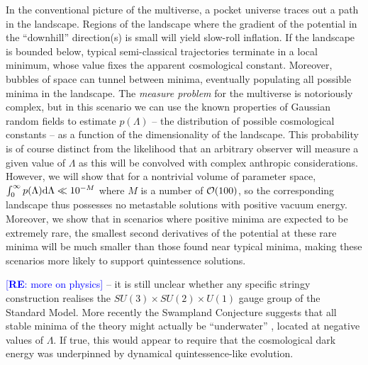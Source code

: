 \documentclass[12pt]{article}
\newcommand{\re}[1]{\textcolor{blue}{[{\bf RE}: #1]}}
\begin{document}
In the conventional picture of the multiverse, a pocket universe traces out a path in the landscape. Regions of the landscape where the gradient of the potential in the ``downhill'' direction(s) is small will yield slow-roll inflation. If the landscape is bounded below, typical semi-classical trajectories terminate in a local minimum, whose value fixes the apparent cosmological constant. Moreover, bubbles of space can tunnel between minima, eventually populating all possible minima in the landscape.  The {\em measure problem\/} for the multiverse is notoriously complex, but in this scenario we can use the known properties of Gaussian random fields to estimate $p(\Lambda)$ -- the distribution of possible cosmological constants -- as a function of the dimensionality of the landscape.  This probability is of course distinct from the likelihood that an arbitrary observer will measure a given value of $\Lambda$ as this will be convolved with complex anthropic considerations. However, we will show that for a nontrivial volume of parameter space,  $\int_0^\infty  p(\Lambda) {\rm d}\Lambda \ll 10^{-M}$  where $M$ is a number of ${\cal{O}}(100)$, so the corresponding landscape thus possesses no metastable solutions with  positive vacuum energy. Moreover, we show that in scenarios where positive minima are expected to be extremely rare, the smallest second derivatives of the potential at these rare minima will be much smaller than those found near typical minima, making these scenarios more likely to support quintessence solutions. 


\re{more on physics} 
 -- it is still unclear whether any specific stringy construction  realises  the $SU(3) \times SU(2) \times U(1)$ gauge group of the Standard Model.  More recently the Swampland Conjecture suggests that all stable minima of the theory might actually be ``underwater'' \cite{Agrawal2018},  located at negative values of $\Lambda$. If true, this would appear to require that the cosmological dark energy was underpinned by dynamical quintessence-like evolution.  
\end{document}
